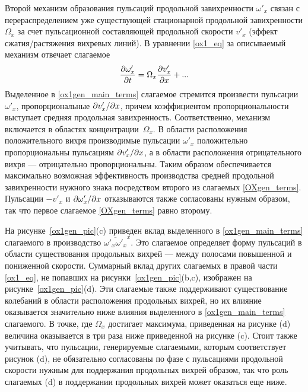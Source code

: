 Второй механизм образования пульсаций продольной завихренности $\omega'_x$ связан с перераспределением уже существующей стационарной продольной завихренности $\Omega_x$ за счет пульсационной составляющей продольной скорости $v'_x$ (эффект сжатия/растяжения вихревых линий). В уравнении \eqref{ox1_eq} за описываемый механизм отвечает слагаемое
\begin{equation}\label{ox1gen_main_terms}
\frac{\partial \omega'_x}{\partial t} = \Omega_x \frac {\partial v'_x}{\partial x} + ...
\end{equation}
Выделенное в \eqref{ox1gen_main_terms} слагаемое стремится произвести пульсации $\omega'_x$, пропорциональные $\partial v'_x / \partial x$, причем коэффициентом пропорциональности выступает средняя продольная завихренность. Соответственно,  механизм включается в областях концентрации~$\Omega_x$. В области расположения положительного вихря производимые пульсации $\omega'_x$ положительно пропорциональны пульсациям $\partial v'_x / \partial x$, а в области расположения отрицательного вихря --- отрицательно пропорциональны. Таким образом обеспечивается максимально возможная эффективность производства средней продольной завихренности нужного знака посредством второго из слагаемых \eqref{OXgen_terms}. Пульсации $-v'_x$ и $\partial \omega'_x / \partial x$ отказываются также согласованы нужным образом, так что первое слагаемое \eqref{OXgen_terms} равно второму.

На рисунке~\ref{ox1gen_pic}(c) приведен вклад выделенного в \eqref{ox1gen_main_terms} слагаемого в производство $\overline{\omega'_x \omega'_x}^x$. Это слагаемое определяет форму пульсаций в области существования продольных вихрей --- между полосами повышенной и пониженной скорости. Суммарный вклад других слагаемых в правой части \eqref{ox1_eq}, не попавших на рисунки~\ref{ox1gen_pic}(b,c), изображен на рисунке~\ref{ox1gen_pic}(d). Эти слагаемые также поддерживают существование колебаний в области расположения продольных вихрей, но их влияние оказывается значительно ниже влияния выделенного в \eqref{ox1gen_main_terms} слагаемого. В точке, где $\Omega_x$ достигает максимума, приведенная на рисунке (d) величина оказывается в три раза ниже приведенной на рисунке (c). Стоит также учитывать, что пульсации, генерируемые слагаемыми, которым соответствует рисунок (d), не обязательно согласованы по фазе с пульсациями продольной скорости нужным для поддержания продольных вихрей образом, так что роль слагаемых (d) в поддержании продольных вихрей может оказаться еще ниже. 

